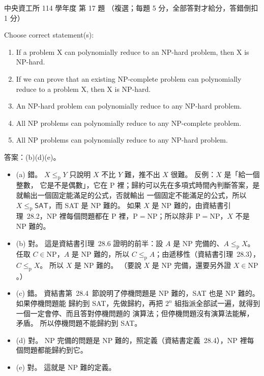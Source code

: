 \begin{pastexam}[label={px:ncu-114-dsa-17}]{中央資工所 114 學年度 第 17 題}
（複選；每題 5 分，全部答對才給分，答錯倒扣 1 分）

Choose correct statement(s):
\begin{enumerate}[label=(\alph*)]
\item If a problem X can polynomially reduce to an NP-hard problem, then X is NP-hard.
\item If we can prove that an existing NP-complete problem can polynomially reduce to a problem X, then
X is NP-hard.
\item An NP-hard problem can polynomially reduce to any NP-hard problem.
\item All NP problems can polynomially reduce to any NP-complete problem.
\item All NP problems can polynomially reduce to any NP-hard problem.
\end{enumerate}
\end{pastexam}

\begin{pastsoln}
答案：(b)(d)(e)。

\begin{itemize}
\item (a) 錯。 $X \le_{\mathrm{p}} Y$ 只說明 $X$ 不比 $Y$ 難，推不出 $X$ 很難。 反例：$X$ 是「給一個整數，
它是不是偶數」，它在 P 裡；歸約可以先在多項式時間內判斷答案，是就輸出一個固定能滿足的公式，否就輸出
一個固定不能滿足的公式，所以 $X \le_{\mathrm{p}} \textsf{SAT}$，而 \textsf{SAT} 是 NP 難的。 如果 $X$ 是
NP 難的，由資結書引理~28.2，NP 裡每個問題都在 P 裡，$\mathrm{P} = \mathrm{NP}$；所以除非
$\mathrm{P} = \mathrm{NP}$，$X$ 不是 NP 難的。
\item (b) 對。 這是資結書引理~28.6 證明的前半：設 $A$ 是 NP 完備的、$A \le_{\mathrm{p}} X$。 任取
$C \in \mathrm{NP}$，$A$ 是 NP 難的，所以 $C \le_{\mathrm{p}} A$；由遞移性（資結書引理~28.3），
$C \le_{\mathrm{p}} X$。 所以 $X$ 是 NP 難的。 （要說 $X$ 是 NP 完備，還要另外證 $X \in \mathrm{NP}$。）
\item (c) 錯。 資結書第~28.4~節說明了停機問題是 NP 難的，\textsf{SAT} 也是 NP 難的。 如果停機問題能
歸約到 \textsf{SAT}，先做歸約，再把 $2^n$ 組指派全部試一遍，就得到一個一定會停、而且答對停機問題的
演算法；但停機問題沒有演算法能解，矛盾。 所以停機問題不能歸約到 \textsf{SAT}。
\item (d) 對。 NP 完備的問題是 NP 難的，照定義（資結書定義~28.4），NP 裡每個問題都能歸約到它。
\item (e) 對。 這就是 NP 難的定義。
\end{itemize}
\end{pastsoln}
